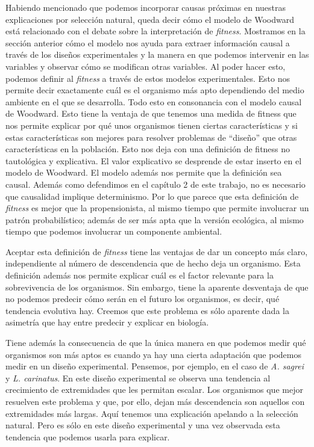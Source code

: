 Habiendo mencionado que podemos incorporar causas próximas en nuestras explicaciones por selección natural, queda decir cómo el modelo de Woodward está relacionado con el debate sobre la interpretación de \emph{fitness}. Mostramos en la sección anterior cómo el modelo nos ayuda para extraer información causal a través de los diseños experimentales y la manera en que podemos intervenir en las variables y observar cómo se modifican otras variables. Al poder hacer esto, podemos definir al \emph{fitness} a través de estos modelos experimentales. Esto nos permite decir exactamente cuál es el organismo más apto dependiendo del medio ambiente en el que se desarrolla. Todo esto en consonancia con el modelo causal de Woodward. Esto tiene la ventaja de que tenemos una medida de fitness que nos permite explicar por qué unos organismos tienen ciertas características y si estas características son mejores para resolver problemas de ``diseño'' que otras características en la población. Esto nos deja con una definición de fitness no tautológica y explicativa. El valor explicativo se desprende de estar inserto en el modelo de Woodward. El modelo además nos permite que la definición sea causal. Además como defendimos en el capítulo 2 de este trabajo, no es necesario que causalidad implique determinismo. Por lo que parece que esta definición de \emph{fitness} es mejor que la propensionista, al mismo tiempo que permite involucrar un patrón probabilístico; además de ser más apta que la versión ecológica, al mismo tiempo que podemos involucrar un componente ambiental.

Aceptar esta definición de \emph{fitness} tiene las ventajas de dar un concepto más claro, independiente al número de descendencia que de hecho deja un organismo. Esta definición además nos permite explicar cuál es el factor relevante para la sobrevivencia de los organismos. Sin embargo, tiene la aparente desventaja de que no podemos predecir cómo serán en el futuro los organismos, es decir, qué tendencia evolutiva hay. Creemos que este problema es sólo aparente dada la asimetría que hay entre predecir y explicar en biología.

Tiene además la consecuencia de que la única manera en que podemos medir qué organismos son más aptos es cuando ya hay una cierta adaptación que podemos medir en un diseño experimental. Pensemos, por ejemplo, en el caso de \emph{A. sagrei} y \emph{L. carinatus}. En este diseño experimental se observa una tendencia al crecimiento de extremidades que les permitan escalar. Los organismos que mejor resuelven este problema y que, por ello, dejan más descendencia son aquellos con extremidades más largas. Aquí tenemos una explicación apelando a la selección natural. Pero es sólo en este diseño experimental y una vez observada esta tendencia que podemos usarla para explicar.


